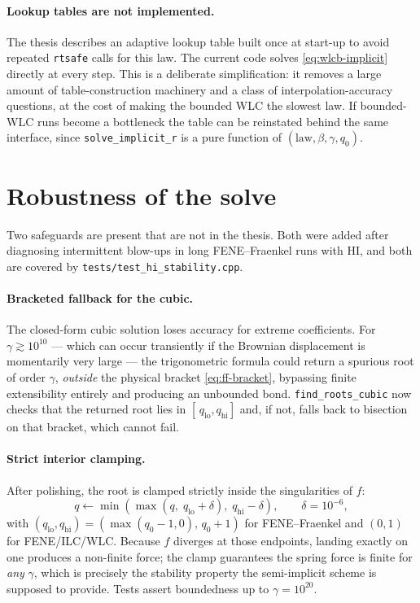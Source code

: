 \documentclass[11pt,a4paper]{report}
\newcommand{\code}[1]{\texttt{\seqsplitcode{#1}}}
\newcommand{\seqsplitcode}[1]{#1}
\begin{document}
\paragraph{Lookup tables are not implemented.} The thesis describes an adaptive
lookup table built once at start-up to avoid repeated \code{rtsafe} calls for
this law. The current code solves \eqref{eq:wlcb-implicit} directly at every
step. This is a deliberate simplification: it removes a large amount of
table-construction machinery and a class of interpolation-accuracy questions, at
the cost of making the bounded WLC the slowest law. If bounded-WLC runs become a
bottleneck the table can be reinstated behind the same interface, since
\code{solve\_implicit\_r} is a pure function of $(\text{law}, \beta, \gamma, q_0)$.

\section{Robustness of the solve}
\label{sec:spring-robustness}

Two safeguards are present that are not in the thesis. Both were added after
diagnosing intermittent blow-ups in long FENE--Fraenkel runs with HI, and both
are covered by \code{tests/test\_hi\_stability.cpp}.

\paragraph{Bracketed fallback for the cubic.} The closed-form cubic solution
loses accuracy for extreme coefficients. For $\gamma \gtrsim 10^{10}$ --- which
can occur transiently if the Brownian displacement is momentarily very large ---
the trigonometric formula could return a spurious root of order $\gamma$,
\emph{outside} the physical bracket \eqref{eq:ff-bracket}, bypassing finite
extensibility entirely and producing an unbounded bond. \code{find\_roots\_cubic}
now checks that the returned root lies in $[\,q_{\mathrm{lo}}, q_{\mathrm{hi}}]$
and, if not, falls back to bisection on that bracket, which cannot fail.

\paragraph{Strict interior clamping.} After polishing, the root is clamped
strictly inside the singularities of $f$:
\begin{equation}
  q \leftarrow \min\!\left(\max(q,\; q_{\mathrm{lo}}+\delta),\; q_{\mathrm{hi}}-\delta\right),
  \qquad \delta = 10^{-6},
\end{equation}
with $(q_{\mathrm{lo}},q_{\mathrm{hi}}) = (\max(q_0-1,0),\,q_0+1)$ for
FENE--Fraenkel and $(0,1)$ for FENE/ILC/WLC. Because $f$ diverges at those
endpoints, landing exactly on one produces a non-finite force; the clamp
guarantees the spring force is finite for \emph{any} $\gamma$, which is precisely
the stability property the semi-implicit scheme is supposed to provide. Tests
assert boundedness up to $\gamma = 10^{20}$.
\end{document}
